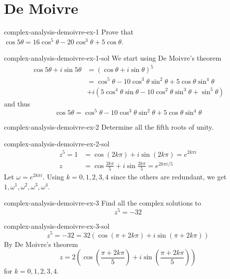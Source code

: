 \documentclass[preview]{standalone}
\begin{document}
\genpage

\section{De Moivre}

\begin{snippetexercise}{complex-analysis-demoivre-ex-1}{} %
    Prove that \(\cos5\theta = 16\cos^5\theta - 20\cos^3\theta+5\cos\theta\).
\end{snippetexercise}

\begin{snippetsolution}{complex-analysis-demoivre-ex-1-sol}{}
    We start using De Moivre's theorem
    \begin{align*}
        \cos5\theta + i\sin5\theta &= (\cos\theta + i\sin\theta)^5 \\
        &= \cos^5\theta - 10\cos^3\theta\sin^2\theta + 5\cos\theta\sin^4\theta \\
            &+ i(5\cos^4\theta\sin\theta -10\cos^2\theta\sin^3\theta + \sin^5\theta)
    \end{align*}
    and thus
    \[ \cos5\theta = \cos^5\theta - 10\cos^3\theta\sin^2\theta + 5\cos\theta\sin^4\theta \]
\end{snippetsolution}

\begin{snippetexercise}{complex-analysis-demoivre-ex-2}{} %
    Determine all the fifth roots of unity.
\end{snippetexercise}

\begin{snippetsolution}{complex-analysis-demoivre-ex-2-sol}{}
    \begin{align*}
        z^5 = 1 &= \cos (2k\pi) + i\sin(2k\pi) = e^{2k\pi i} \\
        z &= \cos \frac{2k\pi}{5} + i \sin \frac{2k\pi}{5} = e^{2k\pi i / 5}
    \end{align*}
    Let \(\omega = e^{2k\pi i}\). Using \(k=0,1,2,3,4\) since the others are redundant, we get
    \(1, \omega^1, \omega^2, \omega^3, \omega^4\).
\end{snippetsolution}

\begin{snippetexercise}{complex-analysis-demoivre-ex-3}{} %
    Find all the complex solutions to
    \[ z^5 = -32 \]
\end{snippetexercise}

\begin{snippetsolution}{complex-analysis-demoivre-ex-3-sol}{}
    \[  z^5 = -32 = 32\left( \cos(\pi + 2k\pi) + i\sin(\pi + 2k\pi) \right) \]
    By De Moivre's theorem
    \[
        z = 2\left( 
            \cos\left(\frac{\pi + 2k\pi}{5}\right) + i\sin\left(\frac{\pi + 2k\pi}{5}\right)
        \right)
    \]
    for \(k=0,1,2,3,4\).
\end{snippetsolution}
\end{document}
